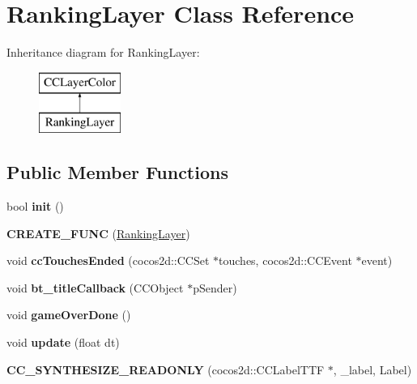 \hypertarget{class_ranking_layer}{\section{Ranking\-Layer Class Reference}
\label{class_ranking_layer}
}
Inheritance diagram for Ranking\-Layer\-:\begin{figure}[H]
\begin{center}
\leavevmode
\includegraphics[height=2.000000cm]{class_ranking_layer}
\end{center}
\end{figure}
\subsection*{Public Member Functions}
\begin{DoxyCompactItemize}
\item 
\hypertarget{class_ranking_layer_a8f6a686bcc9788ab3f4745c8c8a5e82e}{bool {\bfseries init} ()}\label{class_ranking_layer_a8f6a686bcc9788ab3f4745c8c8a5e82e}

\item 
\hypertarget{class_ranking_layer_a3b0bef6c92abe72060cf62e2966ea725}{{\bfseries C\-R\-E\-A\-T\-E\-\_\-\-F\-U\-N\-C} (\hyperlink{class_ranking_layer}{Ranking\-Layer})}\label{class_ranking_layer_a3b0bef6c92abe72060cf62e2966ea725}

\item 
\hypertarget{class_ranking_layer_a61b8effbab3bb6886cc10f236f54e156}{void {\bfseries cc\-Touches\-Ended} (cocos2d\-::\-C\-C\-Set $\ast$touches, cocos2d\-::\-C\-C\-Event $\ast$event)}\label{class_ranking_layer_a61b8effbab3bb6886cc10f236f54e156}

\item 
\hypertarget{class_ranking_layer_a188cbaba21acd692fd2d421eb066d612}{void {\bfseries bt\-\_\-title\-Callback} (C\-C\-Object $\ast$p\-Sender)}\label{class_ranking_layer_a188cbaba21acd692fd2d421eb066d612}

\item 
\hypertarget{class_ranking_layer_a1f8015dacd603db27cffcbdcef82a814}{void {\bfseries game\-Over\-Done} ()}\label{class_ranking_layer_a1f8015dacd603db27cffcbdcef82a814}

\item 
\hypertarget{class_ranking_layer_a8b7ce994c05c986761f9d61c56d51584}{void {\bfseries update} (float dt)}\label{class_ranking_layer_a8b7ce994c05c986761f9d61c56d51584}

\item 
\hypertarget{class_ranking_layer_a179d5096b19d62ad08ec909ab5ada32e}{{\bfseries C\-C\-\_\-\-S\-Y\-N\-T\-H\-E\-S\-I\-Z\-E\-\_\-\-R\-E\-A\-D\-O\-N\-L\-Y} (cocos2d\-::\-C\-C\-Label\-T\-T\-F $\ast$, \-\_\-label, Label)}\label{class_ranking_layer_a179d5096b19d62ad08ec909ab5ada32e}

\end{DoxyCompactItemize}
